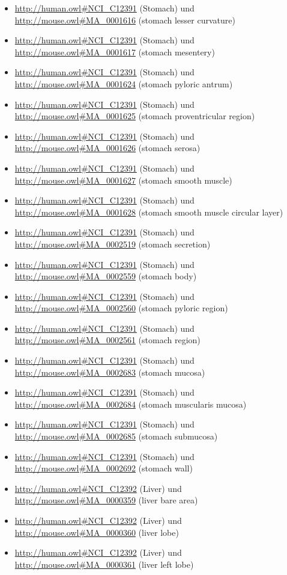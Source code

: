 \begin{itemize}
	\item \url{http://human.owl#NCI_C12391} (Stomach) und \url{http://mouse.owl#MA_0001616} (stomach lesser curvature)
	\item \url{http://human.owl#NCI_C12391} (Stomach) und \url{http://mouse.owl#MA_0001617} (stomach mesentery)
	\item \url{http://human.owl#NCI_C12391} (Stomach) und \url{http://mouse.owl#MA_0001624} (stomach pyloric antrum)
	\item \url{http://human.owl#NCI_C12391} (Stomach) und \url{http://mouse.owl#MA_0001625} (stomach proventricular region)
	\item \url{http://human.owl#NCI_C12391} (Stomach) und \url{http://mouse.owl#MA_0001626} (stomach serosa)
	\item \url{http://human.owl#NCI_C12391} (Stomach) und \url{http://mouse.owl#MA_0001627} (stomach smooth muscle)
	\item \url{http://human.owl#NCI_C12391} (Stomach) und \url{http://mouse.owl#MA_0001628} (stomach smooth muscle circular layer)
	\item \url{http://human.owl#NCI_C12391} (Stomach) und \url{http://mouse.owl#MA_0002519} (stomach secretion)
	\item \url{http://human.owl#NCI_C12391} (Stomach) und \url{http://mouse.owl#MA_0002559} (stomach body)
	\item \url{http://human.owl#NCI_C12391} (Stomach) und \url{http://mouse.owl#MA_0002560} (stomach pyloric region)
	\item \url{http://human.owl#NCI_C12391} (Stomach) und \url{http://mouse.owl#MA_0002561} (stomach region)
	\item \url{http://human.owl#NCI_C12391} (Stomach) und \url{http://mouse.owl#MA_0002683} (stomach mucosa)
	\item \url{http://human.owl#NCI_C12391} (Stomach) und \url{http://mouse.owl#MA_0002684} (stomach muscularis mucosa)
	\item \url{http://human.owl#NCI_C12391} (Stomach) und \url{http://mouse.owl#MA_0002685} (stomach submucosa)
	\item \url{http://human.owl#NCI_C12391} (Stomach) und \url{http://mouse.owl#MA_0002692} (stomach wall)
	\item \url{http://human.owl#NCI_C12392} (Liver) und \url{http://mouse.owl#MA_0000359} (liver bare area)
	\item \url{http://human.owl#NCI_C12392} (Liver) und \url{http://mouse.owl#MA_0000360} (liver lobe)
	\item \url{http://human.owl#NCI_C12392} (Liver) und \url{http://mouse.owl#MA_0000361} (liver left lobe)

\end{itemize}
